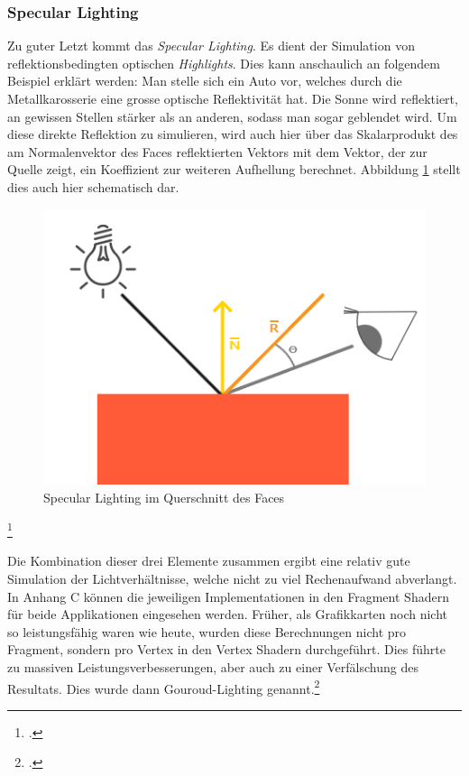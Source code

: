 \documentclass[titlepage, 11pt, a4paper, ngerman]{article}
\begin{document}
\subsubsection{Specular Lighting}
Zu guter Letzt kommt das \textit{Specular Lighting}. Es dient der Simulation von reflektionsbedingten optischen \textit{Highlights}. Dies kann anschaulich an folgendem Beispiel erklärt werden: Man stelle sich ein Auto vor, welches durch die Metallkarosserie eine grosse optische Reflektivität hat. Die Sonne wird reflektiert, an gewissen Stellen stärker als an anderen, sodass man sogar geblendet wird. Um diese direkte Reflektion zu simulieren, wird auch hier über das Skalarprodukt des am Normalenvektor des \glspl{Face} reflektierten Vektors mit dem Vektor, der zur Quelle zeigt, ein Koeffizient zur weiteren Aufhellung berechnet. Abbildung \ref{fig:specular} stellt dies auch hier schematisch dar.
\begin{figure}[ht]
    \centering
    \includegraphics[scale=0.35]{res/specular_light.png}
    \caption[Specular Lighting im Querschnitt des \glspl{Face}]{Specular Lighting im Querschnitt des \glspl{Face}\footnotemark}
    \label{fig:specular}
\end{figure}
\footcitetext{logl-lighting}

Die Kombination dieser drei Elemente zusammen ergibt eine relativ gute Simulation der Lichtverhältnisse, welche nicht zu viel Rechenaufwand abverlangt. In Anhang C können die jeweiligen Implementationen in den \gls{Fragment} \gls{Shader}n für beide Applikationen eingesehen werden. Früher, als Grafikkarten noch nicht so leistungsfähig waren wie heute, wurden diese Berechnungen nicht pro \gls{Fragment}, sondern pro \gls{Vertex} in den \gls{Vertex} \gls{Shader}n durchgeführt. Dies führte zu massiven Leistungsverbesserungen, aber auch zu einer Verfälschung des Resultats. Dies wurde dann Gouroud-Lighting genannt.\footcite{logl-lighting}
\end{document}
